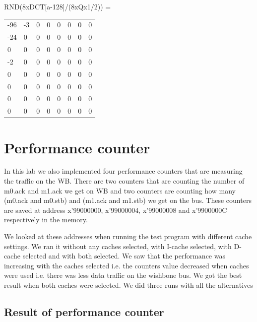 \documentclass[a4paper]{article}
\begin{document}
RND(8xDCT[a-128]/(8xQx1/2)) =  \newline  \newline
\begin{tabular}{l l l l l l l l}
  -96   &  -3   &   0   &   0  &    0  &    0   &   0 &     0 \\
  -24    &  0    &  0   &   0   &   0   &   0   &   0   &   0 \\
    0    &  0   &   0   &   0   &   0   &   0    &  0   &   0 \\
   -2    &  0   &   0    &  0   &   0   &   0    &  0   &   0 \\
    0    &  0    &  0    &  0   &   0   &   0  &    0   &   0 \\
    0    &  0   &   0    &  0   &   0   &   0    &  0    &   0 \\
    0    &  0   &   0    &  0   &   0   &   0    &  0     & 0 \\
    0    &  0   &   0   &   0   &   0   &   0   &   0     & 0 \\

\end{tabular}


\section{Performance counter}

In this lab we also implemented four performance counters that are
measuring the traffic on the WB. There are two counters that are
counting the number of m0.ack and m1.ack we get on WB and two counters
are counting how many (m0.ack and m0.stb) and (m1.ack and m1.stb) we get
on the bus. These counters are saved at address x’99000000, x’99000004,
x’99000008 and x’9900000C respectively in the memory.

We looked at these addresses when running the test program with
different cache settings. We ran it without any caches selected, with
I-cache selected, with D-cache selected and with both selected.  We saw
that the performance was increasing with the caches selected i.e. the
counters value decreased when caches were used i.e. there was less data
traffic on the wishbone bus. We got the best result when both caches
were selected. We did three runs with all the alternatives


\subsection{Result of performance counter}
\end{document}
